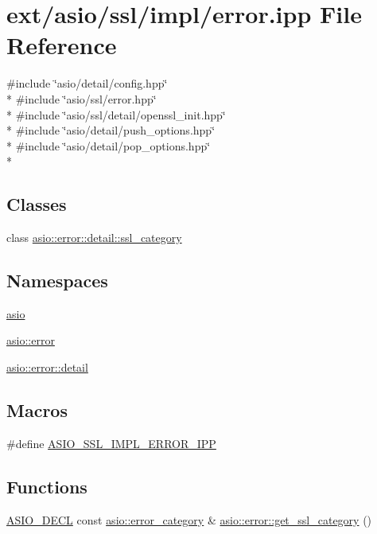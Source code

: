 \hypertarget{ssl_2impl_2error_8ipp}{}\section{ext/asio/ssl/impl/error.ipp File Reference}
\label{ssl_2impl_2error_8ipp}
{\ttfamily \#include \char`\"{}asio/detail/config.\+hpp\char`\"{}}\\*
{\ttfamily \#include \char`\"{}asio/ssl/error.\+hpp\char`\"{}}\\*
{\ttfamily \#include \char`\"{}asio/ssl/detail/openssl\+\_\+init.\+hpp\char`\"{}}\\*
{\ttfamily \#include \char`\"{}asio/detail/push\+\_\+options.\+hpp\char`\"{}}\\*
{\ttfamily \#include \char`\"{}asio/detail/pop\+\_\+options.\+hpp\char`\"{}}\\*
\subsection*{Classes}
\begin{DoxyCompactItemize}
\item 
class \hyperlink{classasio_1_1error_1_1detail_1_1ssl__category}{asio\+::error\+::detail\+::ssl\+\_\+category}
\end{DoxyCompactItemize}
\subsection*{Namespaces}
\begin{DoxyCompactItemize}
\item 
 \hyperlink{namespaceasio}{asio}
\item 
 \hyperlink{namespaceasio_1_1error}{asio\+::error}
\item 
 \hyperlink{namespaceasio_1_1error_1_1detail}{asio\+::error\+::detail}
\end{DoxyCompactItemize}
\subsection*{Macros}
\begin{DoxyCompactItemize}
\item 
\#define \hyperlink{ssl_2impl_2error_8ipp_aa86d08e847eb0391d533fbb966e7294c}{A\+S\+I\+O\+\_\+\+S\+S\+L\+\_\+\+I\+M\+P\+L\+\_\+\+E\+R\+R\+O\+R\+\_\+\+I\+P\+P}
\end{DoxyCompactItemize}
\subsection*{Functions}
\begin{DoxyCompactItemize}
\item 
\hyperlink{config_8hpp_ab54d01ea04afeb9a8b39cfac467656b7}{A\+S\+I\+O\+\_\+\+D\+E\+C\+L} const \hyperlink{classasio_1_1error__category}{asio\+::error\+\_\+category} \& \hyperlink{namespaceasio_1_1error_a0e204a09e28aaebddc5437232c643ae7}{asio\+::error\+::get\+\_\+ssl\+\_\+category} ()
\end{DoxyCompactItemize}


